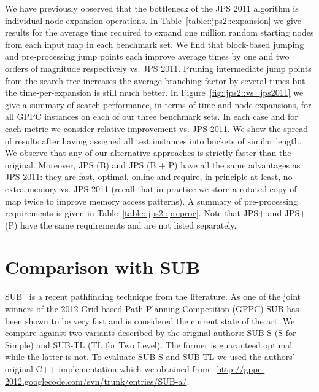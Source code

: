 We have previously observed that the bottleneck of the JPS 2011 algorithm is individual node
expansion operations. In Table~\ref{table::jps2::expansion} we give results for the average
time required to expand one million random starting nodes from each input map in
each benchmark set. We find that block-based jumping and pre-processing jump points
each improve average times by one and two orders of magnitude respectively vs. JPS 2011.
Pruning intermediate jump points from the search tree increases the average branching 
factor by several times but the time-per-expansion is still much better. 
In Figure~\ref{fig::jps2::vs_jps2011} we give a summary of search performance, in terms
of time and node expansions, for all GPPC instances on each of our three benchmark sets. 
In each case and for each metric we consider relative improvement vs. JPS 2011.
We show the spread of results after having assigned all test instances into buckets of 
similar length.
We observe that any of our alternative approaches is strictly faster than the original. 
Moreover, JPS (B) and JPS (B + P) have all the same advantages as JPS 2011: they are 
fast, optimal, online and require, in principle at least, no extra memory vs. JPS 2011
(recall that in practice we store a rotated copy of map twice to improve memory access
patterns).
A summary of pre-processing requirements is given in Table~\ref{table::jps2::preproc}. Note
that JPS+ and JPS+ (P) have the same requirements and are not listed separately.



\section{Comparison with SUB}
SUB~\cite{urasKH13} is a recent pathfinding technique from the literature.
As one of the joint winners of the 2012 Grid-based Path Planning Competition (GPPC) 
SUB has been shown to be very fast and is considered the current state of the art.
We compare against two variants described by the original authors: SUB-S (S
for Simple) and SUB-TL (TL for Two Level). The former is guaranteed optimal
while the latter is not.  To evaluate SUB-S and SUB-TL we used the authors'
original C++ implementation which we obtained from~{\small
\url{http://gppc-2012.googlecode.com/svn/trunk/entries/SUB-a/}}.


